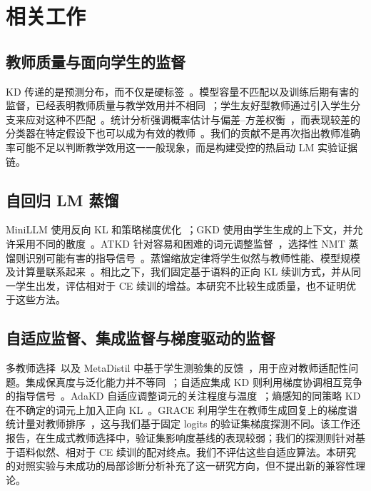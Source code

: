 \section{相关工作}\label{sec:related-work}

\subsection{教师质量与面向学生的监督}
KD 传递的是预测分布，而不仅是硬标签~\citep{hinton2015distilling}。模型容量不匹配以及训练后期有害的监督，已经表明教师质量与教学效用并不相同~\citep{cho2019efficacy}；学生友好型教师通过引入学生分支来应对这种不匹配~\citep{park2021friendly}。统计分析强调概率估计与偏差--方差权衡~\citep{menon2021statistical}，而表现较差的分类器在特定假设下也可以成为有效的教师~\citep{kaplun2022bad}。我们的贡献不是再次指出教师准确率可能不足以判断教学效用这一一般现象，而是构建受控的热启动 LM 实验证据链。

\subsection{自回归 LM 蒸馏}
MiniLLM 使用反向 KL 和策略梯度优化~\citep{gu2024minillm}；GKD 使用由学生生成的上下文，并允许采用不同的散度~\citep{agarwal2024gkd}。ATKD 针对容易和困难的词元调整监督~\citep{zhong2024atkd}，选择性 NMT 蒸馏则识别可能有害的指导信号~\citep{wang2021selective}。蒸馏缩放定律将学生似然与教师性能、模型规模及计算量联系起来~\citep{busbridge2025scaling}。相比之下，我们固定基于语料的正向 KL 续训方式，并从同一学生出发，评估相对于 CE 续训的增益。本研究不比较生成质量，也不证明优于这些方法。

\subsection{自适应监督、集成监督与梯度驱动的监督}
多教师选择~\citep{yuan2021selection}以及 MetaDistil 中基于学生测验集的反馈~\citep{zhou2022metadistil}，用于应对教师适配性问题。集成保真度与泛化能力并不等同~\citep{stanton2021really}；自适应集成 KD 则利用梯度协调相互竞争的指导信号~\citep{du2020agree}。AdaKD 自适应调整词元的关注程度与温度~\citep{xie2026adakd}；熵感知的同策略 KD 在不确定的词元上加入正向 KL~\citep{jin2026entropy}。GRACE 利用学生在教师生成回复上的梯度谱统计量对教师排序~\citep{panigrahi2026grace}，这与我们基于固定 logits 的验证集梯度探测不同。该工作还报告，在生成式教师选择中，验证集影响度基线的表现较弱；我们的探测则针对基于语料似然、相对于 CE 续训的配对终点。我们不评估这些自适应算法。本研究的对照实验与未成功的局部诊断分析补充了这一研究方向，但不提出新的兼容性理论。
